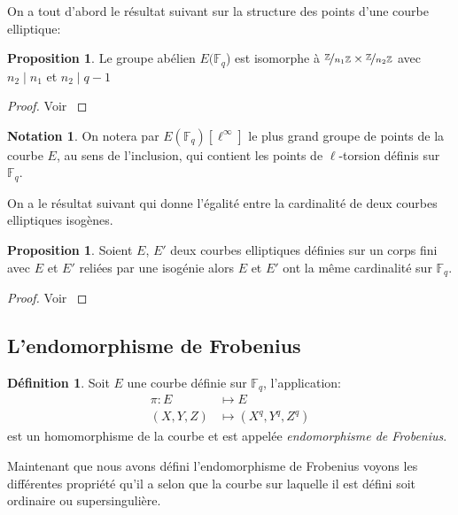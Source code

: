 \documentclass[10pt,a4paper]{book}
\theoremstyle{plain}
\theoremstyle{definition}
\theoremstyle{definition}
\theoremstyle{definition}
\newtheorem{prop}[thm]{Proposition}
\theoremstyle{definition}
\newtheorem{defi}[thm]{Définition}
\theoremstyle{remark}
\theoremstyle{remark}
\theoremstyle{definition}
\newtheorem{nota}[thm]{Notation}
\begin{document}
On a tout d'abord le résultat suivant sur la structure des points d'une courbe elliptique:
\begin{prop}
Le groupe abélien $E(\mathbb{F}_q$) est isomorphe à $\nicefrac{\mathbb{Z}}{n_1 \mathbb{Z}} \times \nicefrac{\mathbb{Z}}{n_2 \mathbb{Z}}$ avec $n_2 \mid n_1$ et $n_2 \mid q-1$
\end{prop}

\begin{proof}
Voir \cite[Theorem 4.1]{Washington2008}
\end{proof}

\begin{nota}
On notera par $E(\mathbb{F}_q)[\ell^{\infty}]$ le plus grand groupe de points 
de la courbe $E$, au sens de l'inclusion, qui contient les points de 
$\ell$-torsion définis sur $\mathbb{F}_q$.
\end{nota}

On a le résultat suivant qui donne l'égalité entre la cardinalité de deux courbes elliptiques isogènes.

\begin{prop}
\label{pro:iso:ega}
Soient $E$, $E'$ deux courbes elliptiques définies sur un corps fini avec $E$ et $E'$ reliées par une isogénie alors $E$ et $E'$ ont la même cardinalité sur $\mathbb{F}_q$.
\end{prop}

\begin{proof}
Voir \cite[Exercise V.5.4.a]{Silv1}
\end{proof}

\subsection{L'endomorphisme de Frobenius}
\begin{defi}
Soit $E$ une courbe définie sur $\mathbb{F}_q$, l'application: 
\begin{equation*}
\begin{alignedat}{1}
\pi :E &\mapsto  E  \\
 (X,Y,Z)  &\mapsto (X^q,Y^q,Z^q)  
\end{alignedat}
\end{equation*}
est un homomorphisme de la courbe et est appelée \emph{endomorphisme de Frobenius}. 
\end{defi}

Maintenant que nous avons défini l'endomorphisme de Frobenius voyons les 
différentes propriété qu'il a selon que la courbe sur laquelle il est défini 
soit ordinaire ou supersingulière.
\end{document}
